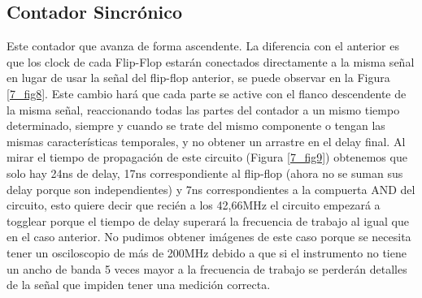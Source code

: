  



\subsection*{Contador Sincr\'onico}
Este contador que avanza de forma ascendente. La diferencia con el anterior es que los clock de cada Flip-Flop estar\'an conectados directamente a la misma señal en lugar de usar la señal del flip-flop anterior, se puede observar en la Figura \ref{7_fig8}. Este cambio har\'a que cada parte se active con el flanco descendente de la misma señal, reaccionando todas las partes del contador a un mismo tiempo determinado, siempre y cuando se trate del mismo componente o tengan las mismas caracter\'isticas temporales, y no obtener un arrastre en el delay final.
\newline
Al mirar el tiempo de propagaci\'on de este circuito (Figura \ref{7_fig9}) obtenemos que solo hay 24ns de delay, 17ns correspondiente al flip-flop (ahora no se suman sus delay porque son independientes) y 7ns correspondientes a la compuerta AND del circuito, esto quiere decir que reci\'en a los 42,66MHz el circuito empezar\'a a togglear porque el tiempo de delay superar\'a la frecuencia de trabajo al igual que en el caso anterior. No pudimos obtener im\'agenes de este caso porque se necesita tener un osciloscopio de m\'as de 200MHz debido a que si el instrumento no tiene un ancho de banda 5 veces mayor a la frecuencia de trabajo se perder\'an detalles de la señal que impiden tener una medici\'on correcta.

